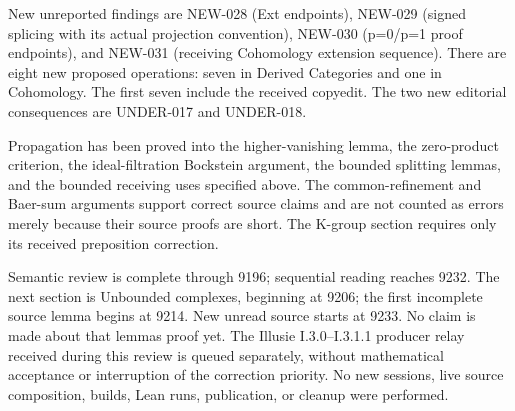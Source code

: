 New unreported findings are NEW-028 (Ext endpoints)\allowbreak{},\allowbreak{} NEW-029 (signed splicing with its actual projection convention)\allowbreak{},\allowbreak{} NEW-030 (p\allowbreak{}=0/\allowbreak{}p\allowbreak{}=1 proof endpoints)\allowbreak{},\allowbreak{} and NEW-031 (receiving Cohomology extension sequence)\allowbreak{}. There are eight new proposed operations:\allowbreak{} seven in Derived Categories and one in Cohomology. The first seven include the received copyedit. The two new editorial consequences are UNDER-017 and UNDER-018.

Propagation has been proved into the higher-vanishing lemma,\allowbreak{} the zero-product criterion,\allowbreak{} the ideal-filtration Bockstein argument,\allowbreak{} the bounded splitting lemmas,\allowbreak{} and the bounded receiving uses specified above. The common-refinement and Baer-sum arguments support correct source claims and are not counted as errors merely because their source proofs are short. The K-group section requires only its received preposition correction.

Semantic review is complete through 9196; sequential reading reaches 9232. The next section is Unbounded complexes,\allowbreak{} beginning at 9206; the first incomplete source lemma begins at 9214. New unread source starts at 9233. No claim is made about that lemma\textquotesingle s proof yet. The Illusie I.3.0–\allowbreak{}I.3.1.1 producer relay received during this review is queued separately,\allowbreak{} without mathematical acceptance or interruption of the correction priority. No new sessions,\allowbreak{} live source composition,\allowbreak{} builds,\allowbreak{} Lean runs,\allowbreak{} publication,\allowbreak{} or cleanup were performed.
